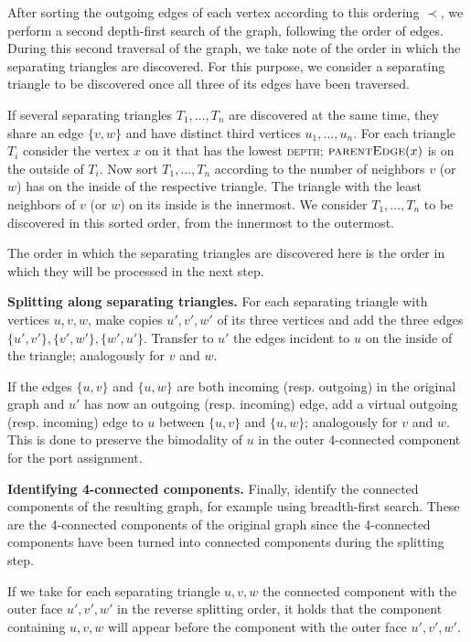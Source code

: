 \documentclass[a4paper]{article}
\begin{document}
After sorting the outgoing edges of each vertex according to this ordering
$\prec$, we
perform a second depth-first search of the graph, following the order of edges.
During this second traversal of the graph, we take note of the order in which
the separating triangles are discovered.
For this purpose, we consider a separating triangle to be discovered once all
three of its edges have been traversed.

If several separating triangles $T_1, \dots, T_n$ are discovered at the same
time, they share an edge $\{v,w\}$ and have distinct third vertices $u_1, \dots,
u_n$.
For each triangle $T_i$ consider the vertex $x$ on it that has the lowest
\textsc{depth}; $\textsc{parentEdge}(x)$ is on the outside of $T_i$.
Now sort $T_1, \dots, T_n$ according to the number of neighbors $v$ (or $w$) has
on the inside of the respective triangle.
The triangle with the least neighbors of $v$ (or $w$) on its inside is the
innermost.
We consider $T_1, \dots, T_n$ to be discovered in this sorted order, from the
innermost to the outermost.

The order in which the separating triangles are discovered here is the order in
which they will be processed in the next step.

\medskip\noindent
\textbf{Splitting along separating triangles.}
For each separating triangle with vertices $u,v,w$, make copies $u',v',w'$ of
its three vertices and add the three edges $\{u',v'\}, \{v',w'\}, \{w',u'\}$.
Transfer to $u'$ the edges incident to $u$ on the inside of the triangle;
analogously for $v$ and $w$.

If the edges $\{u,v\}$ and $\{u,w\}$ are both incoming (resp. outgoing) in the
original graph and $u'$ has now an outgoing (resp. incoming) edge, add a virtual
outgoing (resp. incoming) edge to $u$ between $\{u,v\}$ and $\{u,w\}$;
analogously for $v$ and $w$.
This is done to preserve the bimodality of $u$ in the outer 4-connected
component for the port assignment.

\medskip\noindent
\textbf{Identifying 4-connected components.}
Finally, identify the connected components of the resulting graph, for example
using breadth-first search.
These are the 4-connected components of the original graph since the 4-connected
components have been turned into connected components during the splitting step.

If we take for each separating triangle $u,v,w$ the connected component with the
outer face $u',v',w'$ in the reverse splitting order, it holds that the
component containing $u,v,w$ will appear before the component with the outer
face $u',v',w'$.
\end{document}
